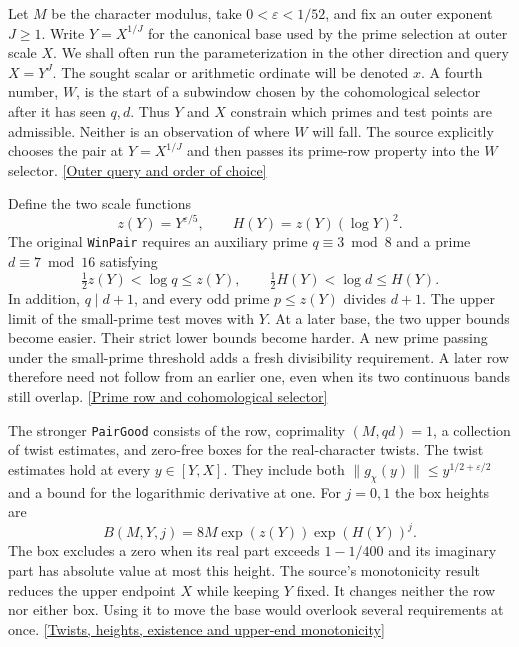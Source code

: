 \documentclass[12pt,letterpaper]{article}
\begin{document}
Let \(M\) be the character modulus, take \(0<\varepsilon<1/52\), and fix an outer exponent \(J\ge1\). Write \(Y=X^{1/J}\) for the canonical base used by the prime selection at outer scale \(X\). We shall often run the parameterization in the other direction and query \(X=Y^J\). The sought scalar or arithmetic ordinate will be denoted \(x\). A fourth number, \(W\), is the start of a subwindow chosen by the cohomological selector after it has seen \(q,d\). Thus \(Y\) and \(X\) constrain which primes and test points are admissible. Neither is an observation of where \(W\) will fall. The source explicitly chooses the pair at \(Y=X^{1/J}\) and then passes its prime-row property into the \(W\) selector. \href{https://github.com/nousentllc/riemann-hypothesis/blob/40e56bab026552e089d7afcfeff08d2defb9c005/src/Development/AutomorphicArithmetic/CharacterBoxes/WinPairs.lean#L26-L35}{[Outer query and order of choice]}

Define the two scale functions
\[
 z(Y)=Y^{\varepsilon/5},\qquad H(Y)=z(Y)(\log Y)^2.
\]
The original \texttt{WinPair} requires an auxiliary prime \(q\equiv3\bmod8\) and a prime \(d\equiv7\bmod16\) satisfying
\[
 \tfrac12 z(Y)<\log q\le z(Y),\qquad
 \tfrac12 H(Y)<\log d\le H(Y).
\]
In addition, \(q\mid d+1\), and every odd prime \(p\le z(Y)\) divides \(d+1\). The upper limit of the small-prime test moves with \(Y\). At a later base, the two upper bounds become easier. Their strict lower bounds become harder. A new prime passing under the small-prime threshold adds a fresh divisibility requirement. A later row therefore need not follow from an earlier one, even when its two continuous bands still overlap. \href{https://github.com/nousentllc/riemann-hypothesis/blob/40e56bab026552e089d7afcfeff08d2defb9c005/src/Development/AutomorphicArithmetic/CharacterBoxes/ExistsPageN.lean#L27-L47}{[Prime row and cohomological selector]}

The stronger \texttt{PairGood} consists of the row, coprimality \( (M,qd)=1\), a collection of twist estimates, and zero-free boxes for the real-character twists. The twist estimates hold at every \(y\in[Y,X]\). They include both \(\lVert g_\chi(y)\rVert\le y^{1/2+\varepsilon/2}\) and a bound for the logarithmic derivative at one. For \(j=0,1\) the box heights are
\[
 B(M,Y,j)=8M\exp(z(Y))\exp(H(Y))^j.
\]
The box excludes a zero when its real part exceeds \(1-1/400\) and its imaginary part has absolute value at most this height. The source's monotonicity result reduces the upper endpoint \(X\) while keeping \(Y\) fixed. It changes neither the row nor either box. Using it to move the base would overlook several requirements at once. \href{https://github.com/nousentllc/riemann-hypothesis/blob/40e56bab026552e089d7afcfeff08d2defb9c005/src/Development/AutomorphicArithmetic/CharacterBoxes/PairGood.lean#L9-L42}{[Twists, heights, existence and upper-end monotonicity]}
\end{document}
